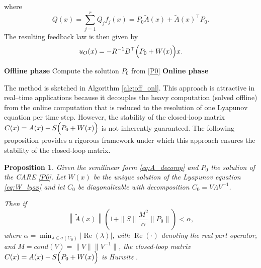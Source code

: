 \documentclass{article}
\newtheorem{proposition}{Proposition}[section]
\newcommand{\first}[1]{{\color{black}{#1}}}
\begin{document}
where 
$$
Q(x) = \sum_{j=1}^{r} Q_j f_j(x) = P_0 \tilde{A}(x) + \tilde{A}(x)^\top P_0.
$$
The resulting feedback law is then given by
\begin{equation}
  u_{O}(x) = -R^{-1}B^\top\Bigl( P_0 + W(x) \Bigr)x.
  \label{eq:feedback_offline_online}
\end{equation}




\begin{algorithm}
\caption{Offline-online SDRE}
\label{alg:off_onl}{
\begin{algorithmic}[1]
\Statex{}
\Statex \textbf{Offline phase}
\State Compute the solution $P_0$ from \eqref{P0}
\Statex{}
\Statex \textbf{Online phase}
\EndFor 
\end{algorithmic}}
\end{algorithm}

The method is sketched in Algorithm \ref{alg:off_onl}.
This approach is attractive in real–time applications because it decouples the heavy computation (solved offline) from the online computation that is reduced to the resolution of one Lyapunov equation per time step. However, the stability of the closed-loop matrix $C(x) = A(x)-S\Bigl(P_0+W(x)\Bigr)$ is not inherently guaranteed. The following proposition provides a rigorous framework under which this approach ensures the stability of the closed-loop matrix.


\begin{proposition}\label{prop:stability}
Given the semilinear form \eqref{eq:A_decomp} and $P_0$ the solution of the CARE \eqref{P0}. Let $W(x)$ be the unique solution of the Lyapunov equation \eqref{eq:W_lyap} and let $C_0$ be diagonalizable with decomposition $C_0 = V \Lambda V^{-1}$.

Then if
\begin{equation}\label{eq:bound2}
\left\|\tilde{A}(x)\right\| \left(1+\|S\|\frac{M^2}{\alpha}\left\|P_0\right\|\right) < \alpha,
\end{equation}
where $\alpha = \min_{\lambda \in \sigma(C_0)} |\operatorname{Re}(\lambda)|$, with $\operatorname{Re}(\cdot)$ denoting the real part operator, and $M = cond(V) = \|V \| \| V^{-1} \|$,
the closed-loop matrix $C(x) = A(x)-S\Bigl(P_0+W(x)\Bigr)$ is Hurwitz \first{(i.e.\ with eigenvalues with negative real part)}.
\end{proposition}
\end{document}
